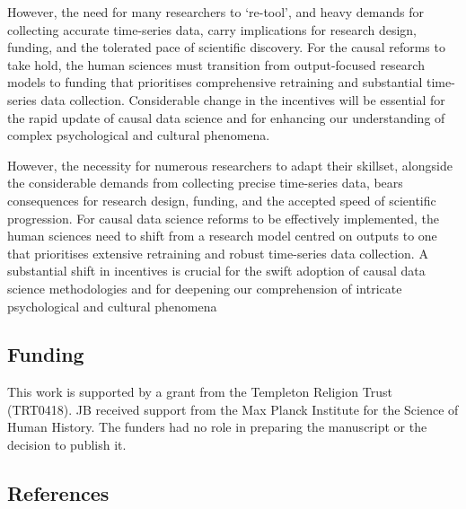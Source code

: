 \documentclass[
  singlecolumn,
  9pt]{article}
\begin{document}
However, the need for many researchers to `re-tool', and heavy demands
for collecting accurate time-series data, carry implications for
research design, funding, and the tolerated pace of scientific
discovery. For the causal reforms to take hold, the human sciences must
transition from output-focused research models to funding that
prioritises comprehensive retraining and substantial time-series data
collection. Considerable change in the incentives will be essential for
the rapid update of causal data science and for enhancing our
understanding of complex psychological and cultural phenomena.

However, the necessity for numerous researchers to adapt their skillset,
alongside the considerable demands from collecting precise time-series
data, bears consequences for research design, funding, and the accepted
speed of scientific progression. For causal data science reforms to be
effectively implemented, the human sciences need to shift from a
research model centred on outputs to one that prioritises extensive
retraining and robust time-series data collection. A substantial shift
in incentives is crucial for the swift adoption of causal data science
methodologies and for deepening our comprehension of intricate
psychological and cultural phenomena

\newpage{}

\subsection{Funding}\label{funding}

This work is supported by a grant from the Templeton Religion Trust
(TRT0418). JB received support from the Max Planck Institute for the
Science of Human History. The funders had no role in preparing the
manuscript or the decision to publish it.

\subsection{References}\label{references}
\end{document}
